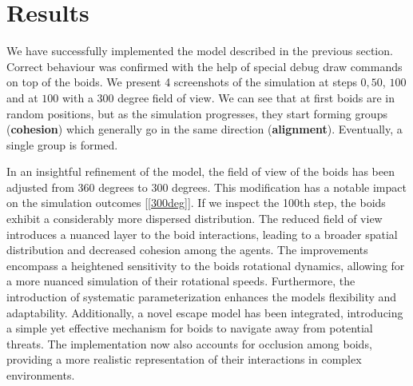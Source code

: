 \documentclass[9pt]{pnas-new}
\begin{document}
\section*{Results}
We have successfully implemented the model described in the previous section.
Correct behaviour was confirmed with the help of special debug draw commands on top of the boids.
We present 4 screenshots of the simulation at steps $0, 50$, $100$ and at $100$ with a 300 degree field of view.
We can see that at first boids are in random positions, but as the simulation progresses, they start forming groups (\textbf{cohesion}) which generally go in the same direction (\textbf{alignment}).
Eventually, a single group is formed.

In an insightful refinement of the model, the field of view of the boids has been adjusted from 360 degrees to 300 degrees. 
This modification has a notable impact on the simulation outcomes [\ref{300deg}]. If we inspect the 100th step, the boids exhibit a considerably more dispersed distribution. 
The reduced field of view introduces a nuanced layer to the boid interactions, leading to a broader spatial distribution and decreased cohesion among the agents.
The improvements encompass a heightened sensitivity to the boids rotational dynamics, allowing for a more nuanced simulation of their rotational speeds. 
Furthermore, the introduction of systematic parameterization enhances the models flexibility and adaptability. 
Additionally, a novel escape model has been integrated, introducing a simple yet effective mechanism for boids to navigate away from potential threats. 
The implementation now also accounts for occlusion among boids, providing a more realistic representation of their interactions in complex environments.
\end{document}
